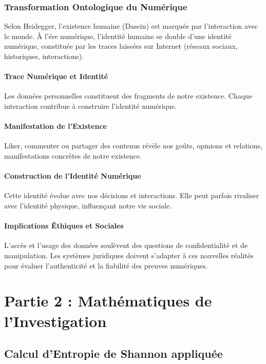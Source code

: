 \documentclass[12pt,a4paper]{article}
\begin{document}
\subsubsection*{Transformation Ontologique du Num\'erique}

Selon Heidegger, l'existence humaine (Dasein) est marqu\'ee par l'interaction avec le monde. \`A l'\'ere num\'erique, l'identit\'e humaine se double d'une identit\'e num\'erique, constitu\'ee par les traces laiss\'ees sur Internet (r\'eseaux sociaux, historiques, interactions).  

\paragraph{Trace Num\'erique et Identit\'e}  
Les donn\'ees personnelles constituent des fragments de notre existence. Chaque interaction contribue \`a construire l'identit\'e num\'erique.

\paragraph{Manifestation de l'Existence}  
Liker, commenter ou partager des contenus r\'ev\`ele nos go\^uts, opinions et relations, manifestations concr\`etes de notre existence.

\paragraph{Construction de l'Identit\'e Num\'erique}  
Cette identit\'e \'evolue avec nos d\'ecisions et interactions. Elle peut parfois rivaliser avec l'identit\'e physique, influen\c cant notre vie sociale.

\paragraph{Implications \'Ethiques et Sociales}  
L'acc\`es et l'usage des donn\'ees soul\`event des questions de confidentialit\'e et de manipulation. Les syst\`emes juridiques doivent s'adapter \`a ces nouvelles r\'ealit\'es pour \'evaluer l'authenticit\'e et la fiabilit\'e des preuves num\'eriques.

\newpage
\section*{Partie 2 : Math\'ematiques de l'Investigation}

\subsection*{Calcul d'Entropie de Shannon appliqu\'ee}
\end{document}
